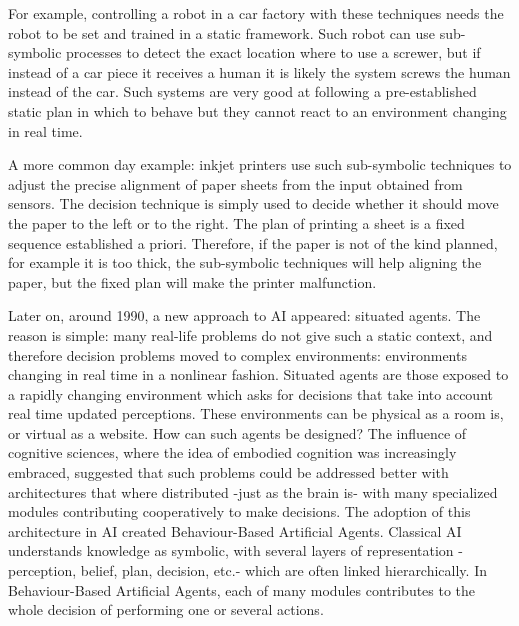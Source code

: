 \documentclass[
		twoside,openright,titlepage,numbers=noenddot,manychapters,
		headinclude,%
                footinclude=false,cleardoublepage=empty,
                BCOR=5mm,
		fontsize=11pt, %
                 enabledeprecatedfontcommands]{scrreprt}
\begin{document}
For example, controlling a robot in a car factory with these techniques needs the robot to be set and trained in a static framework. Such robot can use sub-symbolic processes to detect the exact location where to use a screwer, but if instead of a car piece it receives a human it is likely the system screws the human instead of the car. Such systems are very good at following a pre-established static plan in which to behave but they cannot react to an environment changing in real time.

A more common day example: inkjet printers use such sub-symbolic techniques to adjust the precise alignment of paper sheets from the input obtained from sensors. The decision technique is simply used to decide whether it should move the paper to the left or to the right. The plan of printing a sheet is a fixed sequence established a priori. Therefore, if the paper is not of the kind planned, for example it is too thick, the sub-symbolic techniques will help aligning the paper, but the fixed plan will make the printer malfunction.

Later on, around 1990, a new approach to AI appeared: situated agents. The reason is simple: many real-life problems do not give such a static context, and therefore decision problems moved to complex environments: environments changing in real time in a nonlinear fashion. Situated agents are those exposed to a rapidly changing environment which asks for decisions that take into account real time updated perceptions. These environments can be physical as a room is, or virtual as a website. How can such agents be designed?
 The influence of cognitive sciences, where the idea of embodied cognition was increasingly embraced, suggested that such problems could be addressed better with architectures that where distributed -just as the brain is- with many specialized modules contributing cooperatively to make decisions. The adoption of this architecture in AI created Behaviour-Based Artificial Agents. Classical AI understands knowledge as symbolic, with several layers of representation -perception, belief, plan, decision, etc.- which are often linked hierarchically. In Behaviour-Based Artificial Agents, each of many modules contributes to the whole decision of performing one or several actions. 
\end{document}
